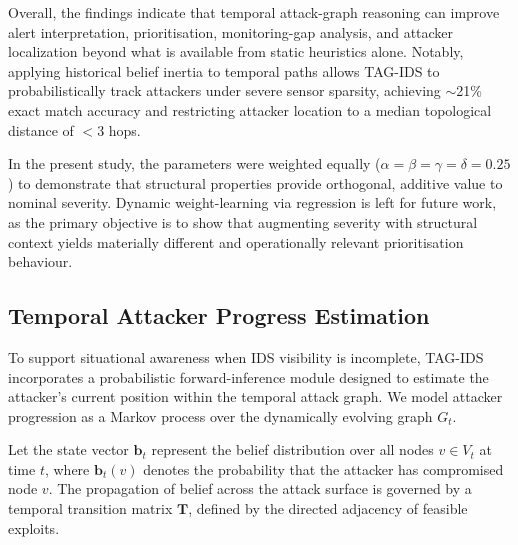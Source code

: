 
Overall, the findings indicate that temporal attack-graph reasoning can improve alert interpretation, prioritisation, monitoring-gap analysis, and attacker localization beyond what is available from static heuristics alone. Notably, applying historical belief inertia to temporal paths allows TAG-IDS to probabilistically track attackers under severe sensor sparsity, achieving $\sim$21\% exact match accuracy and restricting attacker location to a median topological distance of $<3$ hops.

In the present study, the parameters were weighted equally ($\alpha = \beta = \gamma = \delta = 0.25$) to demonstrate that structural properties provide orthogonal, additive value to nominal severity. Dynamic weight-learning via regression is left for future work, as the primary objective is to show that augmenting severity with structural context yields materially different and operationally relevant prioritisation behaviour.

\subsection{Temporal Attacker Progress Estimation}
To support situational awareness when IDS visibility is incomplete, TAG-IDS incorporates a probabilistic forward-inference module designed to estimate the attacker's current position within the temporal attack graph. We model attacker progression as a Markov process over the dynamically evolving graph $G_t$.

Let the state vector $\mathbf{b}_t$ represent the belief distribution over all nodes $v \in V_t$ at time $t$, where $\mathbf{b}_t(v)$ denotes the probability that the attacker has compromised node $v$. The propagation of belief across the attack surface is governed by a temporal transition matrix $\mathbf{T}$, defined by the directed adjacency of feasible exploits.

